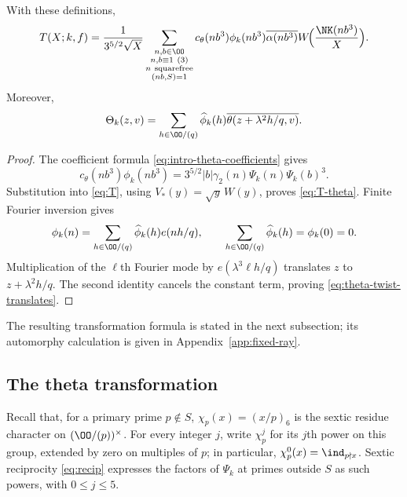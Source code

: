 \begin{lemma}\label{lem:theta-realization}
With these definitions,
\begin{equation}\label{eq:T-theta}
 T(X;k,f)=\frac1{3^{5/2}\sqrt X}
 \sum_{\substack{n,b\in\OO\\n,b\equiv1\ (3)\\n\ {\rm squarefree}\\(nb,S)=1}}
 c_\theta(nb^3)\phi_k(nb^3)\overline{\alpha(nb^3)}
 W\!\Bigl(\frac{\NK(nb^3)}X\Bigr).
\end{equation}
Moreover,
\begin{equation}\label{eq:theta-twist-translates}
 \Theta_k(z,v)=\sum_{h\in\OO/(q)}\widehat\phi_k(h)
       \overline{\theta(z+\lambda^2h/q,v)}.
\end{equation}
\end{lemma}
\begin{proof}
The coefficient formula \eqref{eq:intro-theta-coefficients} gives
\[
 c_\theta(nb^3)\phi_k(nb^3)
 =3^{5/2}|b|\gamma_2(n)\Psi_k(n)\Psi_k(b)^3.
\]
Substitution into \eqref{eq:T}, using $V_*(y)=\sqrt y\,W(y)$,
proves \eqref{eq:T-theta}.
Finite Fourier inversion gives
\[
 \phi_k(n)=\sum_{h\in\OO/(q)}\widehat\phi_k(h)e(nh/q),
 \qquad
 \sum_{h\in\OO/(q)}\widehat\phi_k(h)=\phi_k(0)=0.
\]
Multiplication of the $\ell$th Fourier mode by
$e(\lambda^3\ell h/q)$ translates $z$ to $z+\lambda^2h/q$.
The second identity cancels the constant term, proving
\eqref{eq:theta-twist-translates}.
\end{proof}
The resulting transformation formula is stated in the next subsection;
its automorphy calculation is given in Appendix~\ref{app:fixed-ray}.

\subsection{The theta transformation}
Recall that, for a primary prime $p\notin S$,
$\chi_p(x)=(x/p)_6$ is the sextic residue character on
$(\OO/(p))^\times$. For every integer $j$, write $\chi_p^j$ for
its $j$th power on this group, extended by zero on multiples of $p$;
in particular, $\chi_p^0(x)=\ind_{p\nmid x}$.
Sextic reciprocity \eqref{eq:recip} expresses the factors of
$\Psi_k$ at primes outside $S$ as such powers, with $0\le j\le5$.



